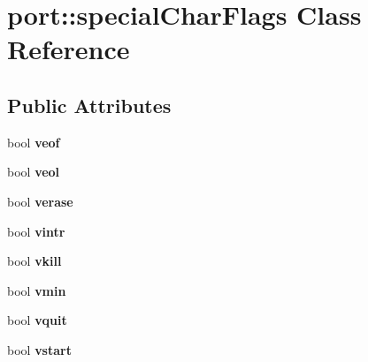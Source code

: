 \hypertarget{classport_1_1specialCharFlags}{}\section{port\+:\+:special\+Char\+Flags Class Reference}
\label{classport_1_1specialCharFlags}
\subsection*{Public Attributes}
\begin{DoxyCompactItemize}
\item 
bool {\bfseries veof}\hypertarget{classport_1_1specialCharFlags_aeee15c6dadf98c5524773b680d5a849e}{}\label{classport_1_1specialCharFlags_aeee15c6dadf98c5524773b680d5a849e}

\item 
bool {\bfseries veol}\hypertarget{classport_1_1specialCharFlags_a70066a4d127357727e9c8c5ca3505dbd}{}\label{classport_1_1specialCharFlags_a70066a4d127357727e9c8c5ca3505dbd}

\item 
bool {\bfseries verase}\hypertarget{classport_1_1specialCharFlags_a4edf74194c7a9eb5dc0fdb14989d7d41}{}\label{classport_1_1specialCharFlags_a4edf74194c7a9eb5dc0fdb14989d7d41}

\item 
bool {\bfseries vintr}\hypertarget{classport_1_1specialCharFlags_ae2f6425e4f5314e6e15dd12c2e803d41}{}\label{classport_1_1specialCharFlags_ae2f6425e4f5314e6e15dd12c2e803d41}

\item 
bool {\bfseries vkill}\hypertarget{classport_1_1specialCharFlags_ad8d70f7741a3f59c900c6a99aaaf3722}{}\label{classport_1_1specialCharFlags_ad8d70f7741a3f59c900c6a99aaaf3722}

\item 
bool {\bfseries vmin}\hypertarget{classport_1_1specialCharFlags_ad574010e272a27087d288ff96b1ca507}{}\label{classport_1_1specialCharFlags_ad574010e272a27087d288ff96b1ca507}

\item 
bool {\bfseries vquit}\hypertarget{classport_1_1specialCharFlags_a0acbd78b808b7968c9f4ce01f42b5adc}{}\label{classport_1_1specialCharFlags_a0acbd78b808b7968c9f4ce01f42b5adc}

\item 
bool {\bfseries vstart}\hypertarget{classport_1_1specialCharFlags_a56a3c7d70d57685a47801b8f1d32184c}{}\label{classport_1_1specialCharFlags_a56a3c7d70d57685a47801b8f1d32184c}


\end{DoxyCompactItemize}
